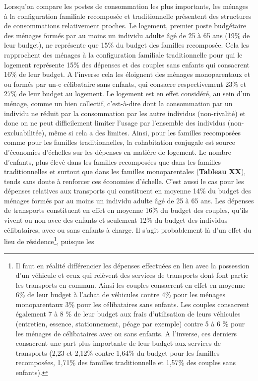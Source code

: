 \documentclass[
  12pt,
]{book}
\begin{document}
Lorsqu'on compare les postes de consommation les plus importants, les
ménages à la configuration familiale recomposée et traditionnelle
présentent des structures de consommations relativement proches. Le
logement, premier poste budgétaire des ménages formés par au moins un
individu adulte âgé de 25 à 65 ans (19\% de leur budget), ne représente
que 15\% du budget des familles recomposée. Cela les rapprochent des
ménages à la configuration familiale traditionnelle pour qui le logement
représente 15\% des dépenses et des couples sans enfants qui consacrent
16\% de leur budget. A l'inverse cela les éloignent des ménages
monoparentaux et ou formés par un-e célibataire sans enfants, qui
consacre respectivement 23\% et 27\% de leur budget au logement. Le
logement est en effet considéré, au sein d'un ménage, comme un bien
collectif, c'est-à-dire dont la consommation par un individu ne réduit
par la consommation par les autre individus (non-rivalité) et donc on ne
peut difficilement limiter l'usage par l'ensemble des individus
(non-excluabilitée), même si cela a des limites. Ainsi, pour les
familles recomposées comme pour les familles traditionnelles, la
cohabitation conjugale est source d'économies d'échelles sur les
dépenses en matière de logement. Le nombre d'enfants, plus élevé dans
les familles recomposées que dans les familles traditionnelles et
surtout que dans les familles monoparentales (\textbf{Tableau XX}),
tends sans doute à renforcer ces économies d'échelle. C'est aussi le cas
pour les dépenses relatives aux transports qui constituent en moyenne
14\% du budget des ménages formés par au moins un individu adulte âgé de
25 à 65 ans. Les dépenses de transports constituent en effet en moyenne
16\% du budget des couples, qu'ils vivent ou non avec des enfants et
seulement 12\% du budget des individus célibataires, avec ou sans
enfants à charge. Il s'agit probablement là d'un effet du lieu de
résidence\footnote{Il faut en réalité différencier les dépenses
  effectuées en lien avec la possession d'un véhicule et ceux qui
  relèvent des services de transports dont font partie les transports en
  commun. Ainsi les couples consacrent en effet en moyenne 6\% de leur
  budget à l'achat de véhicules contre 4\% pour les ménages
  monoparentaux 3\% pour les célibataires sans enfants. Les couples
  consacrent également 7 à 8 \% de leur budget aux frais d'utilisation
  de leurs véhicules (entretien, essence, stationnement, péage par
  exemple) contre 5 à 6 \% pour les ménages de célibataires avec ou sans
  enfants. A l'inverse, ces derniers consacrent une part plus importante
  de leur budget aux services de transports (2,23 et 2,12\% contre
  1,64\% du budget pour les familles recomposées, 1,71\% des familles
  traditionnelle et 1,57\% des couples sans enfants).}, puisque les
\end{document}
